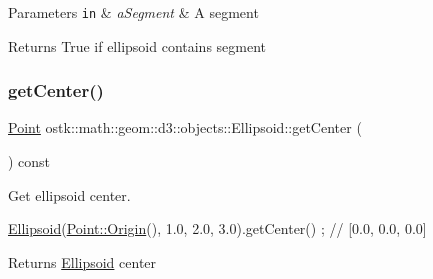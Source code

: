 \begin{DoxyParams}[1]{Parameters}
\mbox{\tt in}  & {\em a\+Segment} & A segment \\
\hline
\end{DoxyParams}
\begin{DoxyReturn}{Returns}
True if ellipsoid contains segment 
\end{DoxyReturn}
\mbox{\label{classostk_1_1math_1_1geom_1_1d3_1_1objects_1_1_ellipsoid_a0b1f86eb5b3cb20a8306a951a6006d4e}} 
\subsubsection{\texorpdfstring{get\+Center()}{getCenter()}}
{\footnotesize\ttfamily \hyperlink{classostk_1_1math_1_1geom_1_1d3_1_1objects_1_1_point}{Point} ostk\+::math\+::geom\+::d3\+::objects\+::\+Ellipsoid\+::get\+Center (\begin{DoxyParamCaption}{ }\end{DoxyParamCaption}) const}



Get ellipsoid center. 


\begin{DoxyCode}
\hyperlink{classostk_1_1math_1_1geom_1_1d3_1_1objects_1_1_ellipsoid_acd84276f65a14db12623402a411712b7}{Ellipsoid}(\hyperlink{classostk_1_1math_1_1geom_1_1d3_1_1objects_1_1_point_a079c199f08b015d456d02728a71b534c}{Point::Origin}(), 1.0, 2.0, 3.0).getCenter() ; \textcolor{comment}{// [0.0, 0.0, 0.0]}
\end{DoxyCode}


\begin{DoxyReturn}{Returns}
\hyperlink{classostk_1_1math_1_1geom_1_1d3_1_1objects_1_1_ellipsoid}{Ellipsoid} center 
\end{DoxyReturn}
\mbox{\label{classostk_1_1math_1_1geom_1_1d3_1_1objects_1_1_ellipsoid_a29d6b71247c279c5940c1ede221a5aac}} 
